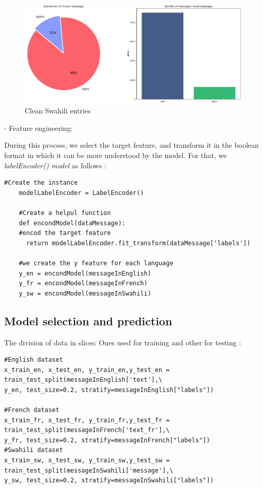 \documentclass[12pt,a4paper, oneside]{book}
\begin{document}
\begin{figure}[h]
	\centering
	\includegraphics[width=01\linewidth]{CollectImages/frenchPlot} 
	\caption{Clean Swahili entries }
	\label{cleanSwahiliEntrie}
\end{figure}

- Feature engineering:

  During this process, we select the target feature, and transform it in the boolean format in which it can be more understood by the model. For that, we \textit{labelEncoder() model} as follows :
  \begin{lstlisting}[style=stylejupyter]
  	#Create the instance
  	modelLabelEncoder = LabelEncoder() 
  	
  	#Create a helpul function
  	def encondModel(dataMessage):
  	#encod the target feature
  	  return modelLabelEncoder.fit_transform(dataMessage['labels'])  
  	
  	#we create the y feature for each language
  	y_en = encondModel(messageInEnglish) 
  	y_fr = encondModel(messageInFrench) 
  	y_sw = encondModel(messageInSwahili)
  \end{lstlisting}

\subsection{Model selection and prediction}
The division of data in slices: Ones used for training and other for testing :
\begin{lstlisting}[style=stylejupyter]
#English dataset
x_train_en, x_test_en, y_train_en,y_test_en = train_test_split(messageInEnglish['text'],\
y_en, test_size=0.2, stratify=messageInEnglish["labels"])

#French dataset
x_train_fr, x_test_fr, y_train_fr,y_test_fr = train_test_split(messageInFrench['text_fr'],\
y_fr, test_size=0.2, stratify=messageInFrench["labels"])
#Swahili dataset
x_train_sw, x_test_sw, y_train_sw,y_test_sw = train_test_split(messageInSwahili['message'],\
y_sw, test_size=0.2, stratify=messageInSwahili["labels"])
\end{lstlisting}
\end{document}
